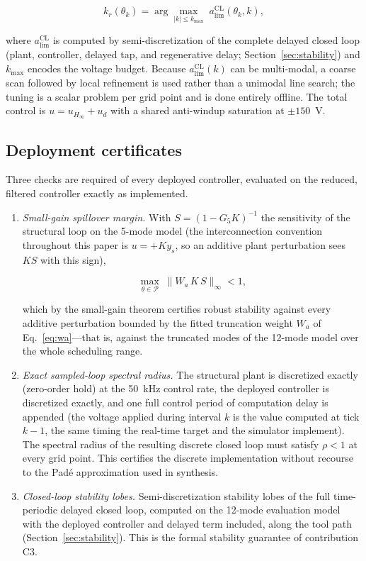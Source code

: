 \documentclass[preprint,12pt]{elsarticle}
\newcommand{\hinf}{H_\infty}
\begin{document}
\begin{equation}
\label{eq:kr}
k_r(\theta_k) = \arg\max_{|k| \le k_{\max}}\;
a_{\lim}^{\mathrm{CL}}(\theta_k, k),
\end{equation}

where $a_{\lim}^{\mathrm{CL}}$ is computed by semi-discretization of the
complete delayed closed loop (plant, controller, delayed tap, and
regenerative delay; Section~\ref{sec:stability}) and $k_{\max}$ encodes
the voltage budget. Because $a_{\lim}^{\mathrm{CL}}(k)$ can be
multi-modal, a coarse scan followed by local refinement is used rather
than a unimodal line search; the tuning is a scalar problem per grid
point and is done entirely offline. The total control is
$u = u_{\hinf} + u_d$ with a shared anti-windup saturation at
$\pm 150$~V.

\subsection{Deployment certificates}
\label{sec:certificates}

Three checks are required of every deployed controller, evaluated on the
reduced, filtered controller exactly as implemented.

\begin{enumerate}
\item \emph{Small-gain spillover margin.} With
$S = (1 - G_5 K)^{-1}$ the sensitivity of the structural loop on the
5-mode model (the interconnection convention throughout this paper is
$u = +K y_s$, so an additive plant perturbation sees $K S$ with this
sign),

\begin{equation}
\label{eq:smallgain}
\max_{\theta \in \mathcal{P}}\;
\bigl\| W_a\, K\, S \bigr\|_\infty < 1,
\end{equation}

which by the small-gain theorem certifies robust stability against
every additive perturbation bounded by the fitted truncation weight
$W_a$ of Eq.~\eqref{eq:wa}---that is, against the truncated modes of the
12-mode model over the whole scheduling range.
\item \emph{Exact sampled-loop spectral radius.} The structural plant is
discretized exactly (zero-order hold) at the 50~kHz control rate, the
deployed controller is discretized exactly, and one full control period
of computation delay is appended (the voltage applied during interval
$k$ is the value computed at tick $k-1$, the same timing the real-time
target and the simulator implement). The spectral radius of the
resulting discrete closed loop must satisfy $\rho < 1$ at every grid
point. This certifies the discrete implementation without recourse to
the Pad\'e approximation used in synthesis.
\item \emph{Closed-loop stability lobes.} Semi-discretization stability
lobes of the full time-periodic delayed closed loop, computed on the
12-mode evaluation model with the deployed controller and delayed term
included, along the tool path (Section~\ref{sec:stability}). This is the
formal stability guarantee of contribution C3.
\end{enumerate}
\end{document}
